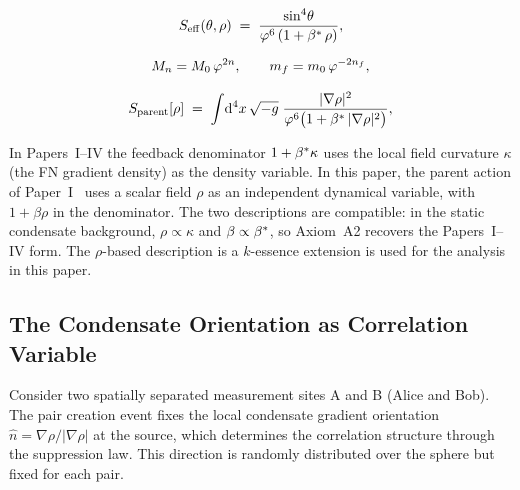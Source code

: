 

\begin{equation}
  S_{\mathrm{eff}}(\theta, \rho)
  \;=\; \frac{\sin^4\!\theta}{\varphi^6\,(1 + \beta^{*}\,\rho)},
  \label{P8:eq:seff_axiom}
\end{equation}

\begin{equation}
  M_n = M_0\,\varphi^{2n}, \qquad
  m_f = m_0\,\varphi^{-2n_f},
  \label{P8:eq:hierarchy_axiom}
\end{equation}

\begin{equation}
  S_{\mathrm{parent}}[\rho]
  \;=\; \int\!\mathrm{d}^4x\,\sqrt{-g}\;
  \frac{|\nabla\rho|^2}{\varphi^6\bigl(1 + \beta^{*}\,|\nabla\rho|^2\bigr)},
  \label{P8:eq:parent_action}
\end{equation}

\begin{remark}
\label{P8:rem:rho_extension}
In Papers~I--IV the feedback denominator $1+\beta^{*}\kappa$ uses the local
field curvature $\kappa$ (the FN gradient density) as the density variable.
In this paper, the parent action of Paper~I~\cite{Paper1} uses a scalar
field $\rho$ as an independent dynamical variable, with $1+\beta\rho$ in
the denominator.  The two descriptions are compatible: in the static
condensate background, $\rho\propto\kappa$ and $\beta\propto\beta^{*}$, so
Axiom~A2 recovers the Papers~I--IV form.  The $\rho$-based description
is a $k$-essence extension is used for the analysis in this paper.
\end{remark}

\subsection*{The Condensate Orientation as Correlation Variable}

Consider two spatially separated measurement sites A and B (Alice and Bob). The pair creation event fixes the local condensate gradient orientation $\hat{n} = \nabla\rho/|\nabla\rho|$ at the source, which determines the correlation structure through the suppression law. This direction is randomly distributed over the sphere but fixed for each pair.

